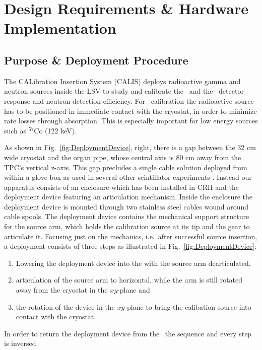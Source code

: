 \section{Design Requirements \& Hardware Implementation} \label{sec:hardware}\label{sec:design_requirements}

\subsection{Purpose \& Deployment Procedure}

The CALibration Insertion System (CALIS) deploys radioactive gamma and neutron sources inside the LSV to study and calibrate the \tpc\ and the \lsv\ detector response and neutron detection efficiency. For \tpc\ calibration the radioactive source has to be positioned in immediate contact with the cryostat, in order to minimize rate losses through absorption. This is especially important for low energy sources such as $^{57}$Co (122 keV). 

As shown in Fig.~\ref{fig:DeploymentDevice}, right, there is a gap between the 32 cm wide cryostat and the organ pipe, whose central axis is 80 cm away from the TPC's vertical z-axis. This gap precludes a single cable solution deployed from within a glove box as used in several other scintillator experiments \cite{Banks:2014hra, Huang:2013uxa}. %
Instead our apparatus consists of an enclosure which has been installed in CRH and the deployment device featuring an articulation mechanism. Inside the enclosure the deployment device is mounted through two stainless steel cables wound around cable spools. The deployment device contains the mechanical support structure for the source arm, which holds the calibration source at its tip and the gear to articulate it. Focusing just on the mechanics, i.e.~after successful source insertion, a deployment consists of three steps as illustrated in Fig.~\ref{fig:DeploymentDevice}:
\begin{enumerate}
\renewcommand{\theenumi}{\Alph{enumi}} %
\item Lowering the deployment device into the \lsv with the source arm dearticulated,
\item articulation of the source arm to horizontal, while the arm is still rotated away from the cryostat in the $xy$-plane and
\item the rotation of the device in the $xy$-plane to bring the calibation source into contact with the cryostat.
\end{enumerate}
In order to return the deployment device from the \lsv\ the sequence and every step is inversed.

